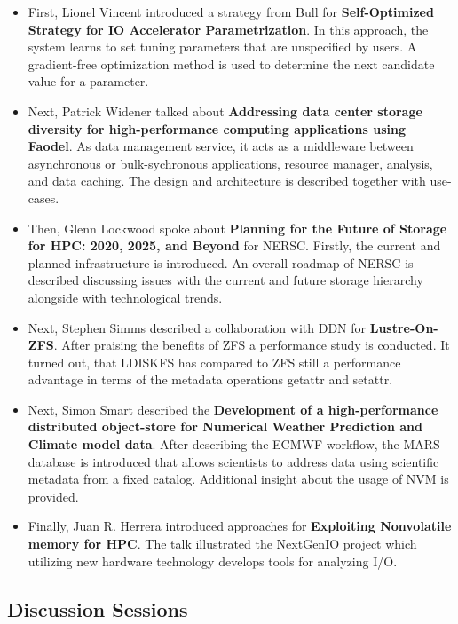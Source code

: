 \documentclass{llncs}
\begin{document}
\begin{itemize}
\item First, Lionel Vincent introduced a strategy from Bull for \textbf{Self-Optimized Strategy for IO Accelerator Parametrization}.
In this approach, the system learns to set tuning parameters that are unspecified by users.
A gradient-free optimization method is used to determine the next candidate value for a parameter.

\item Next, Patrick Widener talked about \textbf{Addressing data center storage diversity for high-performance computing applications using Faodel}.
As data management service, it acts as a middleware between asynchronous or bulk-sychronous applications, resource manager, analysis, and data caching.
The design and architecture is described together with use-cases.

\item Then, Glenn Lockwood spoke about \textbf{Planning for the Future of Storage for HPC: 2020, 2025, and Beyond} for NERSC.
Firstly, the current and planned infrastructure is introduced.
An overall roadmap of NERSC is described discussing issues with the current and future storage hierarchy alongside with technological trends.


\item Next, Stephen Simms described a collaboration with DDN for  \textbf{Lustre-On-ZFS}.
After praising the benefits of ZFS a performance study is conducted.
It turned out, that LDISKFS has compared to ZFS still a performance advantage in terms of the metadata operations getattr and setattr.


\item Next, Simon Smart described the \textbf{Development of a high-performance distributed object-store for Numerical Weather Prediction and Climate model data}.
After describing the ECMWF workflow, the MARS database is introduced that allows scientists to address data using scientific metadata from a fixed catalog.
Additional insight about the usage of NVM is provided.

\item Finally, Juan R. Herrera introduced approaches for \textbf{Exploiting Nonvolatile memory for HPC}. The talk illustrated the NextGenIO project which utilizing new hardware technology develops tools for analyzing I/O.
\end{itemize}


\subsection{Discussion Sessions}
\end{document}
